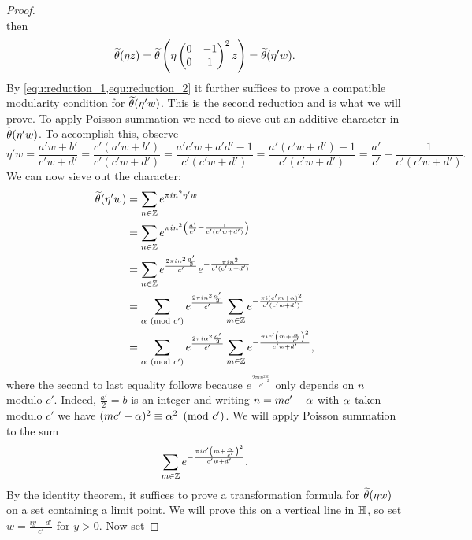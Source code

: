 \documentclass[12pt,reqno,oneside]{amsart}
\begin{document}
\begin{proof}
\[        \]
        then
        \begin{equation}\label{equ:reduction_2}
            \widetilde{\theta}(\eta z) = \widetilde{\theta}\left(\eta \begin{pmatrix} 0 & -1 \\ 0 & 1 \end{pmatrix}^{2} z\right) = \widetilde{\theta}(\eta'w).
        \end{equation}
        By \cref{equ:reduction_1,equ:reduction_2} it further suffices to prove a compatible modularity condition for $\widetilde{\theta}(\eta'w)$. This is the second reduction and is what we will prove. To apply Poisson summation we need to sieve out an additive character in $\widetilde{\theta}(\eta'w)$. To accomplish this, observe
        \[
            \eta' w = \frac{a'w+b'}{c'w+d'} = \frac{c'(a'w+b')}{c'(c'w+d')} = \frac{a'c'w+a'd'-1}{c'(c'w+d')} = \frac{a'(c'w+d')-1}{c'(c'w+d')} = \frac{a'}{c'}-\frac{1}{c'(c'w+d')}.
        \]
        We can now sieve out the character:
        \begin{equation}\label{equ:character_sieve}
            \begin{aligned}
                \widetilde{\theta}(\eta'w) &= \sum_{n \in \mathbb{Z}}e^{\pi in^{2}\eta'w} \\
                &= \sum_{n \in \mathbb{Z}}e^{\pi in^{2}\left(\frac{a'}{c'}-\frac{1}{c'(c'w+d')}\right)} \\
                &= \sum_{n \in \mathbb{Z}}e^{\frac{2\pi in^{2}\frac{a'}{2}}{c'}}e^{-\frac{\pi in^{2}}{c'(c'w+d')}} \\
                &= \sum_{\alpha \ \left(\text{mod }c'\right)}e^{\frac{2\pi in^{2}\frac{a'}{2}}{c'}}\sum_{m \in \mathbb{Z}}e^{-\frac{\pi i(c'm+\alpha)^{2}}{c'(c'w+d')}} \\
                &= \sum_{\alpha \ \left(\text{mod }c'\right)}e^{\frac{2\pi i\alpha^{2}\frac{a'}{2}}{c'}}\sum_{m \in \mathbb{Z}}e^{-\frac{\pi ic'\left(m+\frac{\alpha}{c'}\right)^{2}}{c'w+d'}},
            \end{aligned}
        \end{equation}
        where the second to last equality follows because $e^{\frac{2\pi in^{2}\frac{a'}{2}}{c'}}$ only depends on $n$ modulo $c'$. Indeed, $\frac{a'}{2} = b$ is an integer and writing $n = mc'+\alpha$ with $\alpha$ taken modulo $c'$ we have $(mc'+\alpha)^{2} \equiv \alpha^{2} \ \left(\text{mod }c'\right)$. We will apply Poisson summation to the sum
        \[
            \sum_{m \in \mathbb{Z}}e^{-\frac{\pi ic'\left(m+\frac{\alpha}{c'}\right)^{2}}{c'w+d'}}.
        \]
        By the identity theorem, it suffices to prove a transformation formula for $\widetilde{\theta}(\eta w)$ on a set containing a limit point. We will prove this on a vertical line in $\mathbb{H}$, so set $w = \frac{iy-d'}{c'}$ for $y > 0$. Now set

\end{proof}
\end{document}
